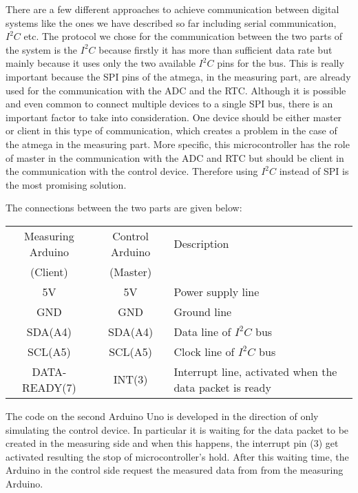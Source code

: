 There are a few different approaches to achieve communication between digital systems like the ones we have described so far including serial communication, $I^2C$ etc. The protocol we chose for the communication between the two parts of the system is the $I^2C$ because firstly it has more than sufficient data rate but mainly because it uses only the two available $I^2C$ pins for the bus. This is really important because the SPI pins of the atmega, in the measuring part, are already used for the communication with the ADC and the RTC. Although it is possible and even common to connect multiple devices to a single SPI bus, there is an important factor to take into consideration. One device should be either master or client in this type of communication, which creates a problem in the case of the atmega in the measuring part. More specific, this microcontroller has the role of master in the communication with the ADC and RTC but should be client in the communication with the control device. Therefore using $I^2C$ instead of SPI is the most promising solution.

The connections between the two parts are given below:

\begin{center}
\begin{tabular}{ c c p{5cm} } 
 Measuring Arduino & Control Arduino & Description \\
 (Client) & (Master) & \\\hline
 5V & 5V & Power supply line \\
 GND & GND & Ground line \\
 SDA(A4) & SDA(A4) & Data line of $I^2C$ bus \\
 SCL(A5) & SCL(A5) & Clock line of $I^2C$ bus \\
 DATA-READY(7) & INT(3) & Interrupt line, activated when the data packet is ready \\
\end{tabular}
\end{center}

The code on the second Arduino Uno is developed in the direction of only simulating the control device. In particular it is waiting for the data packet to be created in the measuring side and when this happens, the interrupt pin (3) get activated resulting the stop of microcontroller's hold. After this waiting time, the Arduino in the control side request the measured data from from the measuring Arduino.

